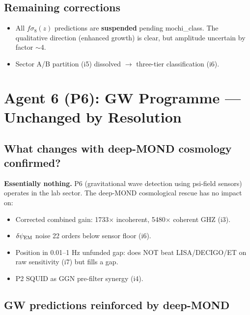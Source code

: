 \documentclass[11pt]{article}
\begin{document}
\subsection{Remaining corrections}
\begin{itemize}
\item All $f\sigma_8(z)$ predictions are \textbf{suspended} pending mochi\_class.
The qualitative direction (enhanced growth) is clear, but amplitude uncertain by
factor $\sim$4.
\item Sector A/B partition (i5) dissolved $\to$ three-tier classification (i6).
\end{itemize}

\newpage
\section{Agent 6 (P6): GW Programme --- Unchanged by Resolution}
\label{sec:agent6}

\subsection{What changes with deep-MOND cosmology confirmed?}

\textbf{Essentially nothing.} P6 (gravitational wave detection using psi-field
sensors) operates in the lab sector. The deep-MOND cosmological rescue has no
impact on:
\begin{itemize}
\item Corrected combined gain: 1733$\times$ incoherent, 5480$\times$ coherent GHZ (i3).
\item $\delta\psi_{\rm EM}$ noise 22 orders below sensor floor (i6).
\item Position in 0.01--1 Hz unfunded gap: does NOT beat LISA/DECIGO/ET on raw
sensitivity (i7) but fills a gap.
\item P2 SQUID as GGN pre-filter synergy (i4).
\end{itemize}

\subsection{GW predictions reinforced by deep-MOND}
\end{document}
